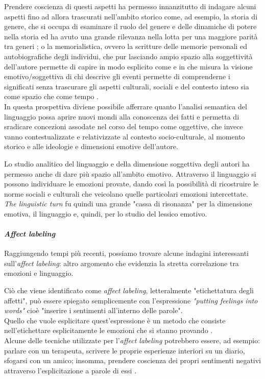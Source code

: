 Prendere coscienza di questi aspetti ha permesso innanzitutto di indagare alcuni aspetti fino ad allora trascurati nell’ambito storico come, ad esempio, la storia di genere, che si occupa di esaminare  il ruolo del genere e delle dinamiche di potere nella storia ed ha avuto una grande rilevanza  nella lotta per una maggiore parità tra generi \parencite{storia_di_genere}; o la memorialistica, ovvero la scritture delle memorie personali ed autobiografiche degli individui, che pur lasciando ampio spazio alla soggettività dell’autore permette di capire in modo esplicito come e in che misura la visione emotivo/soggettiva di chi descrive gli eventi permette di comprenderne i significati senza trascurare gli aspetti culturali, sociali e del contesto inteso sia come spazio che come tempo \parencite{memorialistica}.\\
In questa prospettiva diviene possibile afferrare quanto l’analisi semantica del linguaggio possa aprire nuovi mondi alla conoscenza dei fatti e permetta di sradicare concezioni assodate nel corso del tempo come oggettive, che invece vanno contestualizzate e relativizzate al contesto socio-culturale, al momento storico e alle ideologie e dimensioni emotive dell'autore. 

Lo studio analitico del linguaggio e della dimensione soggettiva degli autori ha permesso anche di dare più spazio all'ambito emotivo. Attraverso il linguaggio si possono individuare le emozioni provate, dando così la possibilità di ricostruire le norme sociali e culturali che veicolano quelle particolari emozioni intercettate.\\
\textit{The linguistic turn} fu quindi una grande "cassa di risonanza" per la dimensione emotiva, il linguaggio e, quindi, per lo studio del lessico emotivo.  

\paragraph{\textit{Affect labeling}}
\label{par: Affect labeling}
Raggiungendo tempi più recenti, possiamo trovare alcune indagini interessanti sull'\textit{affect labeling}: altro argomento che evidenzia la stretta correlazione tra emozioni e linguaggio.

Ciò che viene identificato come \textit{affect labeling}, letteralmente "etichettatura degli affetti", può essere spiegato semplicemente con l'espressione \textit{"putting feelings into words"} cioè "inserire i sentimenti all'interno delle parole".\\
Quello che vuole esplicitare quest'espressione è un metodo che consiste nell'etichettare esplicitamente le emozioni che si stanno provando \parencite{naural_basis_labeling}.\\
Alcune delle tecniche utilizzate per l'\textit{affect labeling} potrebbero essere, ad esempio: parlare con un terapeuta, scrivere le proprie esperienze interiori su un diario, sfogarsi con un amico; insomma, prendere coscienza dei propri sentimenti negativi attraverso l'esplicitazione a parole di essi \parencite{modalità_labeling}. 

